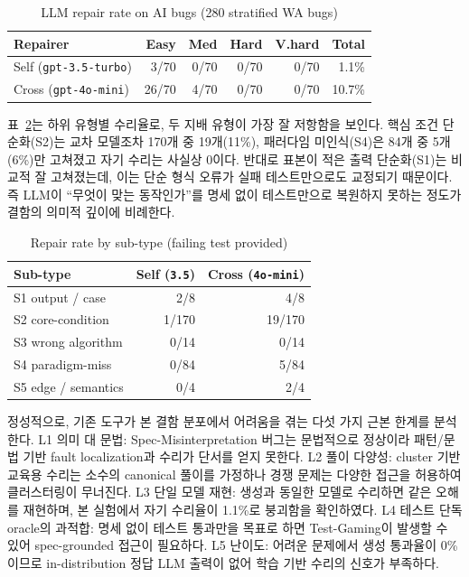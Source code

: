 \documentclass[10pt,conference]{IEEEtran}
\begin{document}
\begin{table}[t]
\caption{LLM repair rate on AI bugs (280 stratified WA bugs)}
\label{tab:apr}
\centering
\begin{tabular}{lrrrrr}
\toprule
Repairer & Easy & Med & Hard & V.hard & Total \\
\midrule
Self (\texttt{gpt-3.5-turbo})  & 3/70  & 0/70 & 0/70 & 0/70 & 1.1\% \\
Cross (\texttt{gpt-4o-mini})   & 26/70 & 4/70 & 0/70 & 0/70 & 10.7\% \\
\bottomrule
\end{tabular}
\end{table}

표~\ref{tab:aprsub}는 하위 유형별 수리율로, 두 지배 유형이 가장 잘 저항함을 보인다. 핵심 조건 단순화(S2)는 교차 모델조차 170개 중 19개(11\%), 패러다임 미인식(S4)은 84개 중 5개(6\%)만 고쳐졌고 자기 수리는 사실상 0이다. 반대로 표본이 적은 출력 단순화(S1)는 비교적 잘 고쳐졌는데, 이는 단순 형식 오류가 실패 테스트만으로도 교정되기 때문이다. 즉 LLM이 ``무엇이 맞는 동작인가''를 명세 없이 테스트만으로 복원하지 못하는 정도가 결함의 의미적 깊이에 비례한다.

\begin{table}[t]
\caption{Repair rate by sub-type (failing test provided)}
\label{tab:aprsub}
\centering
\begin{tabular}{lrr}
\toprule
Sub-type & Self (\texttt{3.5}) & Cross (\texttt{4o-mini}) \\
\midrule
S1 output / case          & 2/8   & 4/8 \\
S2 core-condition         & 1/170 & 19/170 \\
S3 wrong algorithm        & 0/14  & 0/14 \\
S4 paradigm-miss          & 0/84  & 5/84 \\
S5 edge / semantics       & 0/4   & 2/4 \\
\bottomrule
\end{tabular}
\end{table}

정성적으로, 기존 도구가 본 결함 분포에서 어려움을 겪는 다섯 가지 근본 한계를 분석한다. L1 의미 대 문법: Spec-Misinterpretation 버그는 문법적으로 정상이라 패턴/문법 기반 fault localization과 수리가 단서를 얻지 못한다. L2 풀이 다양성: cluster 기반 교육용 수리는 소수의 canonical 풀이를 가정하나 경쟁 문제는 다양한 접근을 허용하여 클러스터링이 무너진다. L3 단일 모델 재현: 생성과 동일한 모델로 수리하면 같은 오해를 재현하며, 본 실험에서 자기 수리율이 1.1\%로 붕괴함을 확인하였다. L4 테스트 단독 oracle의 과적합: 명세 없이 테스트 통과만을 목표로 하면 Test-Gaming이 발생할 수 있어 spec-grounded 접근이 필요하다. L5 난이도: 어려운 문제에서 생성 통과율이 0\%이므로 in-distribution 정답 LLM 출력이 없어 학습 기반 수리의 신호가 부족하다.
\end{document}
